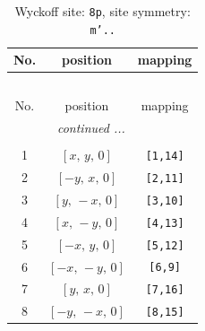 \documentclass[fleqn,8pt]{jsarticle}
\begin{document}
\renewcommand{\arraystretch}{1.2}
\begin{longtable}{ccc}
\caption{Wyckoff site: {\tt 8p}, site symmetry: {\tt m'..}}
 \\
 \hline \hline
No. & position & mapping \\ \hline \endfirsthead

\multicolumn{2}{l}{\tablename\ \thetable{}} \\
 \hline \hline
No. & position & mapping \\ \hline \endhead

 \hline \hline
\multicolumn{2}{r}{\footnotesize\it continued ...} \\ \endfoot

 \hline \hline
\multicolumn{2}{r}{} \\ \endlastfoot

1 & $\left[ x,\, y,\, 0 \right]$ & {\tt [1,14]} \\ \hline
2 & $\left[ - y,\, x,\, 0 \right]$ & {\tt [2,11]} \\ \hline
3 & $\left[ y,\, - x,\, 0 \right]$ & {\tt [3,10]} \\ \hline
4 & $\left[ x,\, - y,\, 0 \right]$ & {\tt [4,13]} \\ \hline
5 & $\left[ - x,\, y,\, 0 \right]$ & {\tt [5,12]} \\ \hline
6 & $\left[ - x,\, - y,\, 0 \right]$ & {\tt [6,9]} \\ \hline
7 & $\left[ y,\, x,\, 0 \right]$ & {\tt [7,16]} \\ \hline
8 & $\left[ - y,\, - x,\, 0 \right]$ & {\tt [8,15]} \\
\end{longtable}
\renewcommand{\arraystretch}{1.2}
\end{document}
